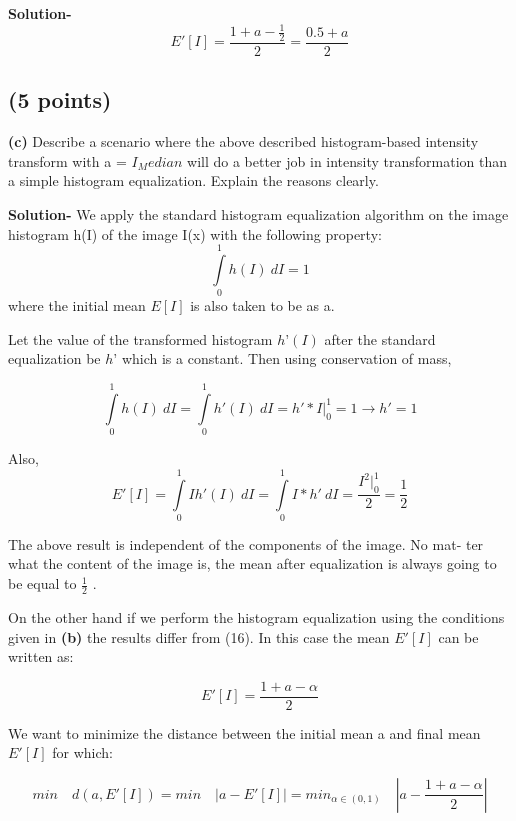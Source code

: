 \documentclass{article}
\begin{document}
\textbf{Solution-}
\begin{equation}E'[I] = \frac{1+a-\frac{1}{2}}{2} = \frac{0.5+a}{2}\end{equation}

\subsection{(5 points)}
\textbf{(c)} Describe a scenario where the above described histogram-based intensity
transform with a = $I_Median$ will do a better job in intensity transformation
than a simple histogram equalization. Explain the reasons clearly.

\textbf{Solution-}
We apply the standard histogram equalization algorithm on the image
histogram h(I) of the image I(x) with the following property:
\begin{equation}\int\limits_0^1 h(I)\ dI = 1\end{equation}
where the initial mean $E[I]$ is also taken to be as a. 

Let the value of the transformed histogram $h’(I)$ after the standard equalization be $h’$ which is a constant.
Then using conservation of mass,

\begin{equation}\int\limits_0^1 h(I)\ dI = \int\limits_0^1 h'(I)\ dI = h'*I|_0^1 = 1 \rightarrow h' = 1\end{equation}

Also,
\begin{equation}E'[I] = \int\limits_0^1 I h'(I)\ dI = \int\limits_0^1 I*h'\ dI =\frac{I^2|_0^1}{2}=\frac{1}{2}\end{equation}

The above result is independent of the components of the image. No mat-
ter what the content of the image is, the mean after equalization is always
going to be equal to $\frac{1}{2}$ .

On the other hand if we perform the histogram equalization using the
conditions given in \textbf{(b)} the results differ from (16). In this case the mean
$E'[I]$ can be written as:

\begin{equation}E'[I] = \frac{1+a-\alpha}{2}\end{equation}

We want to minimize the distance between the initial mean a and final
mean $E'[I]$ for which:

\begin{equation}min\quad d(a,E'[I]) = min\quad|a-E'[I]| = min_{\alpha\in(0,1)} \quad|a-\frac{1+a-\alpha}{2}|\end{equation}
\end{document}
